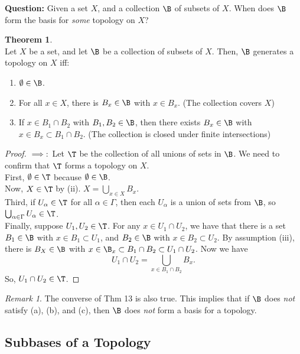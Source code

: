 \documentclass[a5paper]{article}
\theoremstyle{definition}%
\newtheorem{theorem}{Theorem}
\numberwithin{exercise}{section}
\theoremstyle{remark}%
\newtheorem*{remark*}{Remark}
\begin{document}
\noindent\textbf{Question:} Given a set $X$, and a collection $\B$ of subsets of $X$. When does $\B$ form the basis for \emph{some} topology on $X$?

\begin{highlight}
\begin{theorem}\mbox{}\\
Let $X$ be a set, and let $\B$ be a collection of subsets of $X$. Then, $\B$ generates a topology on $X$ iff:
\begin{enumerate}[label=(\roman*)]
\item $\emptyset\in\B$.
\item For all $x\in X$, there is $B_x\in \B$ with $x\in B_x$. (The collection covers $X$)
\item If $x\in B_1\cap B_2$ with $B_1, B_2 \in \B$, then there exists $B_x\in \B$ with $x\in B_x\subset B_1\cap B_2$. (The collection is closed under finite intersections)
\end{enumerate}
\end{theorem}
\end{highlight}
\begin{proof}
$\implies:$ Let $\T$ be the collection of all unions of sets in $\B$. We need to confirm that $\T$ forms a topology on $X$. \\
First, $\emptyset\in\T$ because $\emptyset\in\B$. \\
Now, $X\in\T$ by (ii). $X=\bigcup_{x\in X}B_x$. \\
Third, if $U_\alpha\in\T$ for all $\alpha\in\Gamma$, then each $U_\alpha$ is a union of sets from $\B$, so $\bigcup_{\alpha\in\Gamma}U_\alpha\in\T$. \\
Finally, suppose $U_1, U_2 \in \T$. For any $x\in U_1\cap U_2$, we have that there is a set $B_1\in\B$ with $x\in B_1\subset U_1$, and $B_2\in\B$ with $x\in B_2\subset U_2$. By assumption (iii), there is $B_X\in\B$ with $x\in\B_x\subset B_1\cap B_2 \subset U_1\cap U_2$. Now we have 
$$U_1\cap U_2 = \bigcup_{x\in B_1\cap B_2}B_x.$$
So, $U_1\cap U_2 \in \T$. 
\end{proof}

\begin{remark*}
The converse of Thm 13 is also true. This implies that if $\B$ does \emph{not} satisfy (a), (b), and (c), then $\B$ does \emph{not} form a basis for a topology.
\end{remark*}

\subsection{Subbases of a Topology}
\end{document}
